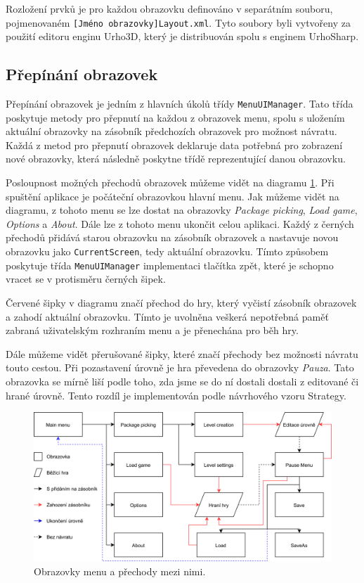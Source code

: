 Rozložení prvků je pro každou obrazovku definováno v separátním souboru, pojmenovaném \texttt{[Jméno obrazovky]Layout.xml}. Tyto soubory byli vytvořeny za použití editoru enginu Urho3D, který je distribuován spolu s enginem UrhoSharp. 

\subsection{Přepínání obrazovek}
Přepínání obrazovek je jedním z hlavních úkolů třídy \texttt{MenuUIManager}. Tato třída poskytuje metody pro přepnutí na každou z obrazovek menu, spolu s uložením aktuální obrazovky na zásobník předchozích obrazovek pro možnost návratu. Každá z  metod pro přepnutí obrazovek deklaruje data potřebná pro zobrazení nové obrazovky, která následně poskytne třídě reprezentující danou obrazovku.

Posloupnost možných přechodů obrazovek můžeme vidět na diagramu \ref{fig:screen_structure}. Při spuštění aplikace je počáteční obrazovkou hlavní menu. Jak můžeme vidět na diagramu, z tohoto menu se lze dostat na obrazovky \textit{Package picking}, \textit{Load game}, \textit{Options} a \textit{About}. Dále lze z tohoto menu ukončit celou aplikaci. Každý z černých přechodů přidává starou obrazovku na zásobník obrazovek a nastavuje novou obrazovku jako \texttt{CurrentScreen}, tedy aktuální obrazovku. Tímto způsobem poskytuje třída \texttt{MenuUIManager} implementaci tlačítka zpět, které je schopno vracet se v protisměru černých šipek.

Červené šipky v diagramu značí přechod do hry, který vyčistí zásobník obrazovek a zahodí aktuální obrazovku. Tímto je uvolněna veškerá nepotřebná paměť zabraná uživatelským rozhraním menu a je přenechána pro běh hry.

Dále můžeme vidět přerušované šipky, které značí přechody bez možnosti návratu touto cestou. Při pozastavení úrovně je hra převedena do obrazovky \textit{Pauza}. Tato obrazovka se mírně liší podle toho, zda jsme se do ní dostali dostali z editované či hrané úrovně. Tento rozdíl je implementován podle návrhového vzoru Strategy.

\begin{figure}[h]
	\centering
	\includegraphics[width=\textwidth]{img/ScreenStructure.png}
	\caption{Obrazovky menu a přechody mezi nimi.}
	\label{fig:screen_structure}
\end{figure}


